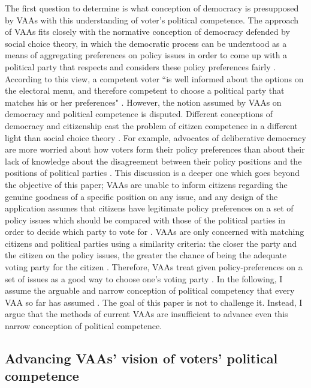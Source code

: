 \documentclass{scrartcl}
\begin{document}
The first question to determine is what conception of democracy is presupposed by VAAs with this understanding of voter's  political competence. The approach of VAAs fits closely with the normative conception of democracy defended by social choice theory, in which the democratic process can be understood as a means of aggregating preferences on policy issues in order to come up with a political party that respects and considers these policy preferences fairly  \cite{anderson2014matching}. According to this view, a competent voter ``is well informed about the options on the electoral menu, and therefore competent to choose a political party that matches his or her preferences" \cite[247]{fossen2014s}. However, the notion assumed by VAAs on democracy and political competence is disputed. Different conceptions of democracy and citizenship cast the problem of citizen competence in a different light than social choice theory \cite{fossen2014s}. For example, advocates of deliberative democracy are more worried about how voters form their policy preferences than about their lack of knowledge about the disagreement between their policy positions and the positions of political parties \cite{caplan2011myth}. This discussion is a deeper one which goes beyond the objective of this paper; VAAs are unable to inform citizens regarding the genuine goodness of a specific position on any issue, and any design of the application assumes that citizens have legitimate policy preferences on a set of policy issues which should be compared with those of the political parties in order to decide which party to vote for \cite{anderson2014matching}. VAAs are only concerned with matching citizens and political parties using a similarity criteria: the closer the party and the citizen on the policy issues, the greater the chance of being the adequate voting party for the citizen \cite{Mendez2012}. Therefore, VAAs treat given policy-preferences on a set of issues as a good way to choose one's voting party \cite{fossen2014s}. In the following, I assume the arguable and narrow conception of political competency that every VAA so far has assumed \cite{anderson2014matching}. The goal of this paper is not to challenge it. Instead, I argue that the methods of current VAAs are insufficient to advance even this narrow conception of political competence. 

\subsection{Advancing VAAs' vision of voters' political competence}
\end{document}
